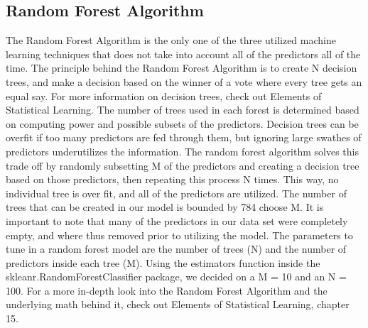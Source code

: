 \documentclass[11pt, oneside]{article}   	%
\begin{document}
\subsection{Random Forest Algorithm}
The Random Forest Algorithm is the only one of the three utilized machine learning techniques that does not take into account all of the predictors all of the time. The principle behind the Random Forest Algorithm is to create N decision trees, and make a decision based on the winner of a vote where every tree gets an equal say. For more information on decision trees, check out Elements of Statistical Learning. \cite{DecisionTree} The number of trees used in each forest is determined based on computing power and possible subsets of the predictors. Decision trees can be overfit if too many predictors are fed through them, but ignoring large swathes of predictors underutilizes the information. The random forest algorithm solves this trade off by randomly subsetting M of the predictors and creating a decision tree based on those predictors, then repeating this process N times. This way, no individual tree is over fit, and all of the predictors are utilized. The number of trees that can be created in our model is bounded by 784 choose M.  It is important to note that many of the predictors in our data set were completely empty, and where thus removed prior to utilizing the model. The parameters to tune in a random forest model are the number of trees (N) and the number of predictors inside each tree (M). Using the estimators function inside the skleanr.RandomForestClassifier package, we decided on a M = 10 and an N = 100. For a more in-depth look into the Random Forest Algorithm and the underlying math behind it, check out Elements of Statistical Learning, chapter 15. \cite{RandomForestBook}
\end{document}
